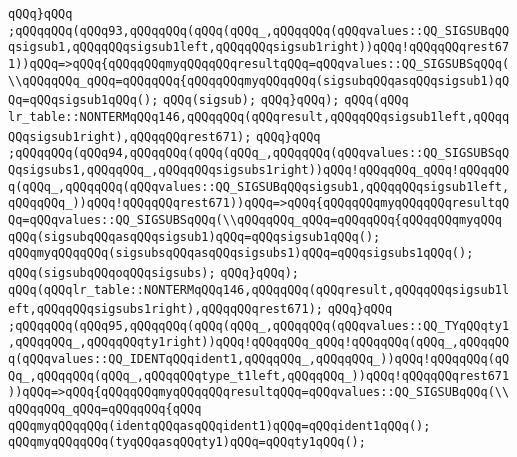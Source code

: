 \verb|qQQq}qQQq|\newline
\verb|;qQQqqQQq(qQQq93,qQQqqQQq(qQQq(qQQq_,qQQqqQQq(qQQqvalues::QQ_SIGSUBqQQqsigsub1,qQQqqQQqsigsub1left,qQQqqQQqsigsub1right))qQQq!qQQqqQQqrest671))qQQq=>qQQq{qQQqqQQqmyqQQqqQQqresultqQQq=qQQqvalues::QQ_SIGSUBSqQQq(\\qQQqqQQq_qQQq=qQQqqQQq{qQQqqQQqmyqQQqqQQq(sigsubqQQqasqQQqsigsub1)qQQq=qQQqsigsub1qQQq();|\newline
\verb|qQQq(sigsub);|\newline
\verb|qQQq}qQQq);|\newline
\verb|qQQq(qQQq|\newline
\verb|lr_table::NONTERMqQQq146,qQQqqQQq(qQQqresult,qQQqqQQqsigsub1left,qQQqqQQqsigsub1right),qQQqqQQqrest671);|\newline
\verb|qQQq}qQQq|\newline
\verb|;qQQqqQQq(qQQq94,qQQqqQQq(qQQq(qQQq_,qQQqqQQq(qQQqvalues::QQ_SIGSUBSqQQqsigsubs1,qQQqqQQq_,qQQqqQQqsigsubs1right))qQQq!qQQqqQQq_qQQq!qQQqqQQq(qQQq_,qQQqqQQq(qQQqvalues::QQ_SIGSUBqQQqsigsub1,qQQqqQQqsigsub1left,qQQqqQQq_))qQQq!qQQqqQQqrest671))qQQq=>qQQq{qQQqqQQqmyqQQqqQQqresultqQQq=qQQqvalues::QQ_SIGSUBSqQQq(\\qQQqqQQq_qQQq=qQQqqQQq{qQQqqQQqmyqQQq|\newline
\verb|qQQq(sigsubqQQqasqQQqsigsub1)qQQq=qQQqsigsub1qQQq();|\newline
\verb|qQQqmyqQQqqQQq(sigsubsqQQqasqQQqsigsubs1)qQQq=qQQqsigsubs1qQQq();|\newline
\verb|qQQq(sigsubqQQqoqQQqsigsubs);|\newline
\verb|qQQq}qQQq);|\newline
\verb|qQQq(qQQqlr_table::NONTERMqQQq146,qQQqqQQq(qQQqresult,qQQqqQQqsigsub1left,qQQqqQQqsigsubs1right),qQQqqQQqrest671);|\newline
\verb|qQQq}qQQq|\newline
\verb|;qQQqqQQq(qQQq95,qQQqqQQq(qQQq(qQQq_,qQQqqQQq(qQQqvalues::QQ_TYqQQqty1,qQQqqQQq_,qQQqqQQqty1right))qQQq!qQQqqQQq_qQQq!qQQqqQQq(qQQq_,qQQqqQQq(qQQqvalues::QQ_IDENTqQQqident1,qQQqqQQq_,qQQqqQQq_))qQQq!qQQqqQQq(qQQq_,qQQqqQQq(qQQq_,qQQqqQQqtype_t1left,qQQqqQQq_))qQQq!qQQqqQQqrest671))qQQq=>qQQq{qQQqqQQqmyqQQqqQQqresultqQQq=qQQqvalues::QQ_SIGSUBqQQq(\\qQQqqQQq_qQQq=qQQqqQQq{qQQq|\newline
\verb|qQQqmyqQQqqQQq(identqQQqasqQQqident1)qQQq=qQQqident1qQQq();|\newline
\verb|qQQqmyqQQqqQQq(tyqQQqasqQQqty1)qQQq=qQQqty1qQQq();|\newline
